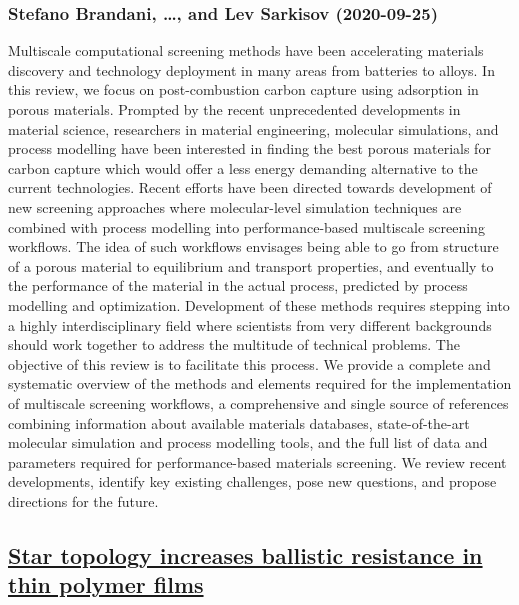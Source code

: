 \subsubsection*{Stefano Brandani, \dots, and Lev Sarkisov (2020-09-25)}
Multiscale computational screening methods have been accelerating materials
discovery and technology deployment in many areas from batteries to alloys. In
this review, we focus on post-combustion carbon capture using adsorption in
porous materials. Prompted by the recent unprecedented developments in material
science, researchers in material engineering, molecular simulations, and
process modelling have been interested in finding the best porous materials for
carbon capture which would offer a less energy demanding alternative to the
current technologies. Recent efforts have been directed towards development of
new screening approaches where molecular-level simulation techniques are
combined with process modelling into performance-based multiscale screening
workflows. The idea of such workflows envisages being able to go from structure
of a porous material to equilibrium and transport properties, and eventually to
the performance of the material in the actual process, predicted by process
modelling and optimization. Development of these methods requires stepping into
a highly interdisciplinary field where scientists from very different
backgrounds should work together to address the multitude of technical
problems. The objective of this review is to facilitate this process. We
provide a complete and systematic overview of the methods and elements required
for the implementation of multiscale screening workflows, a comprehensive and
single source of references combining information about available materials
databases, state-of-the-art molecular simulation and process modelling tools,
and the full list of data and parameters required for performance-based
materials screening. We review recent developments, identify key existing
challenges, pose new questions, and propose directions for the future.

\subsection*{\href{http://arxiv.org/abs/2009.12288v1}{Star topology increases ballistic resistance in thin polymer films}}
